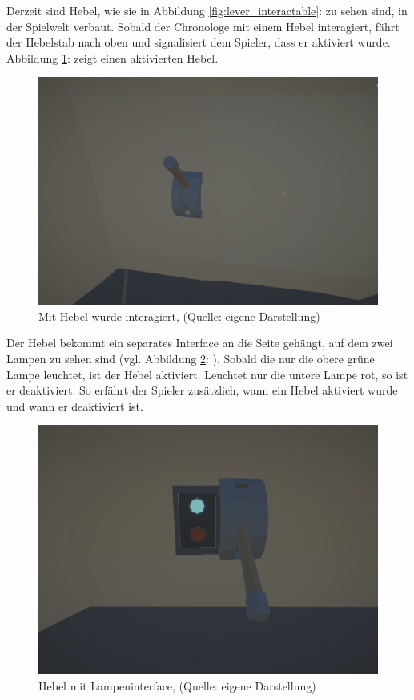 Derzeit sind Hebel, wie sie in Abbildung \ref{fig:lever_interactable}:  zu sehen sind, in der Spielwelt verbaut. Sobald der Chronologe mit einem Hebel interagiert, fährt der Hebelstab nach oben und signalisiert dem Spieler, dass er aktiviert wurde. Abbildung \ref{fig:lever_interactable_active}:  zeigt einen aktivierten Hebel.

\begin{figure}[ht]
\centering
\includegraphics[width=0.8\linewidth]{content/pictures/Lever_active.jpg}
\caption{Mit Hebel wurde interagiert, (Quelle: eigene Darstellung)}
\label{fig:lever_interactable_active}
\end{figure}

Der Hebel bekommt ein separates Interface an die Seite gehängt, auf dem zwei Lampen zu sehen sind (vgl. Abbildung \ref{fig:lever_interactable_active_diods}: ). Sobald die nur die obere grüne Lampe leuchtet, ist der Hebel aktiviert. Leuchtet nur die untere Lampe rot, so ist er deaktiviert. So erfährt der Spieler zusätzlich, wann ein Hebel aktiviert wurde und wann er deaktiviert ist.

\begin{figure}[ht]
\centering
\includegraphics[width=0.8\linewidth]{content/pictures/Lever_activator_diod.jpg}
\caption{Hebel mit Lampeninterface, (Quelle: eigene Darstellung)}
\label{fig:lever_interactable_active_diods}
\end{figure}

